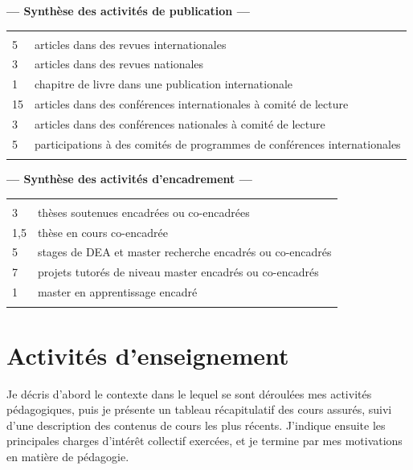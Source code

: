 \documentclass[11pt]{article}
\begin{document}
\begin{center}
	\textbf{--- Synthèse des activités de publication ---}\\[1mm]
\begin{tabular}{ll}
	\hline\\[-2mm]
	5	&	articles dans des revues internationales\\
	3	&	articles dans des revues nationales\\
	1	&	chapitre de livre dans une publication internationale\\
	15	& 	articles dans des conférences internationales à comité de lecture\\
	3	&	articles dans des conférences nationales à comité de lecture\\
	5	& 	participations à des comités de programmes de conférences internationales\\
	\hline\\
\end{tabular}


	\textbf{--- Synthèse des activités d'encadrement ---}\\[1mm]
\begin{tabular}{ll}
	\hline\\[-2mm]
	3	&	thèses soutenues encadrées ou co-encadrées\\
	1,5	& 	thèse en cours co-encadrée\\
	5	&	stages de DEA et master recherche encadrés ou co-encadrés\\
	7	& 	projets tutorés de niveau master encadrés ou co-encadrés\\
	1	& 	master en apprentissage encadré\\
	\hline\\
\end{tabular}

\end{center}



\newpage

\section{Activités d'enseignement}
\label{sc:ensgnt-univ}

Je décris d'abord le contexte dans le lequel se sont déroulées mes activités
pédagogiques, puis je présente un tableau récapitulatif des cours assurés, suivi
d'une description des contenus de cours les plus récents. J'indique ensuite les
principales charges d'intérêt collectif exercées, et je termine par mes motivations
en matière de pédagogie.
\end{document}
